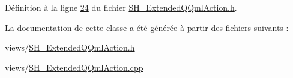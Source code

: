 Définition à la ligne \hyperlink{SH__ExtendedQQmlAction_8h_source_l00024}{24} du fichier \hyperlink{SH__ExtendedQQmlAction_8h_source}{S\-H\-\_\-\-Extended\-Q\-Qml\-Action.\-h}.



La documentation de cette classe a été générée à partir des fichiers suivants \-:\begin{DoxyCompactItemize}
\item 
views/\hyperlink{SH__ExtendedQQmlAction_8h}{S\-H\-\_\-\-Extended\-Q\-Qml\-Action.\-h}\item 
views/\hyperlink{SH__ExtendedQQmlAction_8cpp}{S\-H\-\_\-\-Extended\-Q\-Qml\-Action.\-cpp}\end{DoxyCompactItemize}
